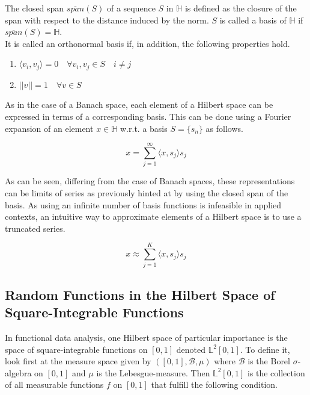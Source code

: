 \documentclass[11pt,twoside,a4paper]{article}
\begin{document}
	The closed span $\overline{span}(S)$ of a sequence $S$ in $\mathbb{H}$ is defined as the closure of the span with respect to the distance induced by the norm. $S$ is called a basis of $\mathbb{H}$ if $\overline{span}(S) = \mathbb{H}$. \\
	It is called an orthonormal basis if, in addition, the following properties hold. 
	
	\begin{multicols}{2}
		\begin{enumerate}
			\item $\langle v_i, v_j \rangle = 0 \quad \forall v_i, v_j \in S \quad i \neq j$
			\item $\lvert \lvert v \rvert \rvert = 1 \quad \forall v \in S$
		\end{enumerate}
	\end{multicols}

	As in the case of a Banach space, each element of a Hilbert space can be expressed in terms of a corresponding basis. This can be done using a Fourier expansion of an element $x \in \mathbb{H}$ w.r.t. a basis $S = \{s_n\}$ as follows.
	
	\begin{equation}
		x = \sum_{j = 1}^{\infty}{\langle x, s_j \rangle}s_j
	\end{equation}
	
	As can be seen, differing from the case of Banach spaces, these representations can be limits of series as previously hinted at by using the closed span of the basis. As using an infinite number of basis functions is infeasible in applied contexts, an intuitive way to approximate elements of a Hilbert space is to use a truncated series.
	
	\begin{equation}
		x \approx \sum_{j = 1}^{K}{\langle x, s_j \rangle}s_j
	\end{equation}
	
	\subsection{Random Functions in the Hilbert Space of Square-Integrable Functions}
	In functional data analysis, one Hilbert space of particular importance is the space of square-integrable functions on $[0,1]$ denoted $\mathbb{L}^2[0,1]$. To define it, look first at the measure space given by $([0,1], \mathcal{B}, \mu)$ where $\mathcal{B}$ is the Borel $\sigma$-algebra on $[0,1]$ and $\mu$ is the Lebesgue-measure. Then $\mathbb{L}^2[0,1]$ is the collection of all measurable functions $f$ on $[0,1]$ that fulfill the following condition.
	
\end{document}
